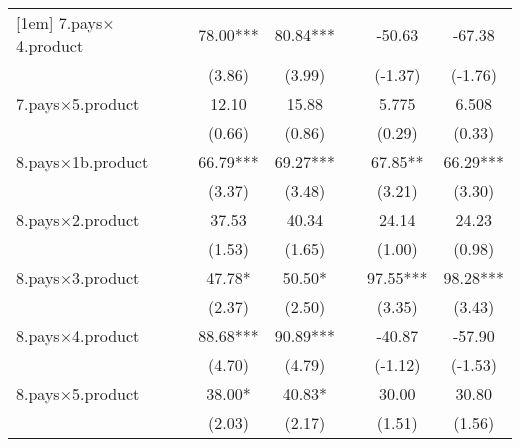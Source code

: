 {\begin{tabular}{l*{6}{c}}
[1em]
7.pays$\times$4.product    &                     &       78.00***&       80.84***&                     &      -50.63         &      -67.38         \\
                    &                     &      (3.86)         &      (3.99)         &                     &     (-1.37)         &     (-1.76)         \\
[1em]
7.pays$\times$5.product    &                     &       12.10         &       15.88         &                     &       5.775         &       6.508         \\
                    &                     &      (0.66)         &      (0.86)         &                     &      (0.29)         &      (0.33)         \\
[1em]
8.pays$\times$1b.product   &                     &       66.79***&       69.27***&                     &       67.85** &       66.29***\\
                    &                     &      (3.37)         &      (3.48)         &                     &      (3.21)         &      (3.30)         \\
[1em]
8.pays$\times$2.product    &                     &       37.53         &       40.34         &                     &       24.14         &       24.23         \\
                    &                     &      (1.53)         &      (1.65)         &                     &      (1.00)         &      (0.98)         \\
[1em]
8.pays$\times$3.product    &                     &       47.78*  &       50.50*  &                     &       97.55***&       98.28***\\
                    &                     &      (2.37)         &      (2.50)         &                     &      (3.35)         &      (3.43)         \\
[1em]
8.pays$\times$4.product    &                     &       88.68***&       90.89***&                     &      -40.87         &      -57.90         \\
                    &                     &      (4.70)         &      (4.79)         &                     &     (-1.12)         &     (-1.53)         \\
[1em]
8.pays$\times$5.product    &                     &       38.00*  &       40.83*  &                     &       30.00         &       30.80         \\
                    &                     &      (2.03)         &      (2.17)         &                     &      (1.51)         &      (1.56)         \\

\end{tabular}}
